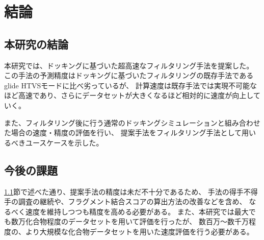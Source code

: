 \chapter{結論}
\section{本研究の結論}\label{sec:conclusion}
本研究では、ドッキングに基づいた超高速なフィルタリング手法を提案した。
この手法の予測精度はドッキングに基づいたフィルタリングの既存手法であるglide HTVSモードに比べ劣っているが、
計算速度は既存手法では実現不可能なほど高速であり、さらにデータセットが大きくなるほど相対的に速度が向上していく。

また、フィルタリング後に行う通常のドッキングシミュレーションと組み合わせた場合の速度・精度の評価を行い、
提案手法をフィルタリング手法として用いるべきユースケースを示した。

\section{今後の課題}
\ref{sec:conclusion}節で述べた通り、提案手法の精度は未だ不十分であるため、
手法の得手不得手の調査の継続や、フラグメント結合スコアの算出方法の改善などを含め、
なるべく速度を維持しつつも精度を高める必要がある。
また、本研究では最大でも数万化合物程度のデータセットを用いて評価を行ったが、
数百万～数千万程度の、より大規模な化合物データセットを用いた速度評価を行う必要がある。